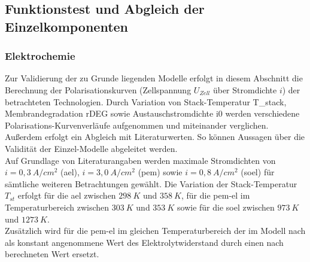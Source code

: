\documentclass[onecolumn,10pt,titlepage]{article}
\begin{document}

\subsection{Funktionstest und Abgleich der Einzelkomponenten}
\subsubsection{Elektrochemie}

Zur Validierung der zu Grunde liegenden Modelle erfolgt in diesem Abschnitt die Berechnung der Polarisationskurven (Zellspannung $U_{Zell}$ über Stromdichte $i$) der betrachteten Technologien.
Durch Variation von Stack-Temperatur \gls{T_stack}, Membrandegradation \gls{rDEG} sowie Austauschstromdichte \gls{i0} werden verschiedene Polarisations-Kurvenverläufe aufgenommen und miteinander verglichen. Außerdem erfolgt ein Abgleich mit Literaturwerten. So können Aussagen über die Validität der Einzel-Modelle abgeleitet werden.\\
Auf Grundlage von Literaturangaben werden maximale Stromdichten von  $i=0,3~A/cm^2$ (\gls{ael}),  $i=3,0~A/cm^2$ (\gls{pem}) sowie $i=0,8~A/cm^2$ (\gls{soel}) für sämtliche weiteren Betrachtungen gewählt.
Die Variation der Stack-Temperatur $T_{st}$ erfolgt für die \gls{ael} zwischen $298~K$ und $358~K$, für die \gls{pem}-\gls{el} im Temperaturbereich zwischen $303~K$ und $353~K$ sowie für die \gls{soel} zwischen $973~K$ und $1273~K$.\\
Zusätzlich wird für die \gls{pem}-\gls{el} im gleichen Temperaturbereich der im Modell nach \cite{Tjarks.2017} als konstant angenommene Wert des Elektrolytwiderstand durch einen nach \cite{Chandesris2015} berechneten Wert ersetzt.
\end{document}
